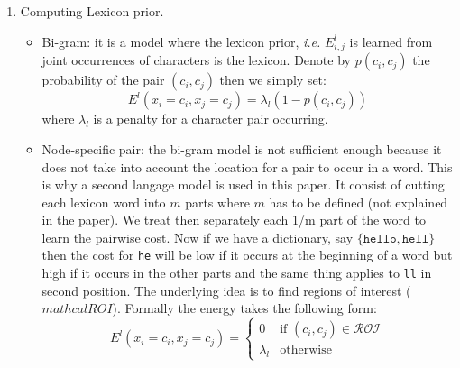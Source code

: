 \documentclass[10pt]{article}
\begin{document}
\begin{enumerate}
\item Computing Lexicon prior.
\begin{itemize}
	\item Bi-gram: it is a model where the lexicon prior, \emph{i.e.} $E_{i,j}^l$ is learned from joint occurrences of characters is the lexicon. Denote by $p(c_i,c_j)$ the probability of the pair $(c_i,c_j)$ then we simply set:
	\begin{equation}
	E^l(x_i = c_i,x_j = c_j) = \lambda_l(1 - p(c_i,c_j)) 
	\label{eq:bigram}
	\end{equation}
	where $\lambda_l$ is a penalty for a character pair occurring.
	
	\item Node-specific pair: the bi-gram model is not sufficient enough because it does not take into account the location for a pair to occur in a word. This is why a second langage model is used in this paper. It consist of cutting each lexicon word into $m$ parts where $m$ has to be defined (not explained in the paper). We treat then separately each 1/m part of the word to learn the pairwise cost. Now if we have a dictionary, say $\{ \texttt{hello}, \texttt{hell}\}$ then the cost for \texttt{he} will be low if it occurs at the beginning of a word but high if it occurs in the other parts and the same thing applies to \texttt{ll} in second position. The underlying idea is to find regions of interest ($mathcal{ROI}$). Formally the energy takes the following form: 
	\begin{equation}
	E^l(x_i = c_i,x_j = c_j) = 
	\left\{
	\begin{array}{rl}
		0 				& \text{if } (c_i,c_j) \in \mathcal{ROI} \\
		\lambda_l & \text{otherwise}
	\end{array}
	\right.
	\label{eq:nodeSpecificPair}
	\end{equation}
\end{itemize}

\end{enumerate}
\end{document}
